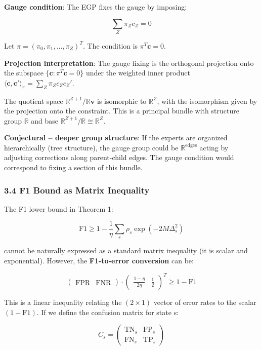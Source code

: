 \documentclass[
  12pt,
]{ctexart}
\begin{document}
\textbf{Gauge condition}: The EGP fixes the gauge by imposing:

\[\sum_{Z} \pi_Z c_Z = 0\]

Let \(\pi = (\pi_0, \pi_1, \dots, \pi_Z)^T\). The condition is
\(\pi^T \mathbf{c} = 0\).

\textbf{Projection interpretation}: The gauge fixing is the orthogonal
projection onto the subspace \(\{\mathbf{c}: \pi^T \mathbf{c} = 0\}\)
under the weighted inner product
\(\langle \mathbf{c}, \mathbf{c}' \rangle_\pi = \sum_Z \pi_Z c_Z c_Z'\).

The quotient space \(\mathbb{R}^{Z+1} / \mathbb{R}\mathbf{v}\) is
isomorphic to \(\mathbb{R}^Z\), with the isomorphism given by the
projection onto the constraint. This is a principal bundle with
structure group \(\mathbb{R}\) and base
\(\mathbb{R}^{Z+1}/\mathbb{R} \cong \mathbb{R}^Z\).

\textbf{Conjectural -- deeper group structure}: If the experts are
organized hierarchically (tree structure), the gauge group could be
\(\mathbb{R}^{\text{edges}}\) acting by adjusting corrections along
parent-child edges. The gauge condition would correspond to fixing a
section of this bundle.

\subsubsection{3.4 F1 Bound as Matrix
Inequality}\label{f1-bound-as-matrix-inequality}

The F1 lower bound in Theorem 1:

\[\text{F1} \geq 1 - \frac{1}{\eta}\sum_s \rho_s \exp(-2M\Delta_s^2)\]

cannot be naturally expressed as a standard matrix inequality (it is
scalar and exponential). However, the \textbf{F1-to-error conversion}
can be:

\[\begin{pmatrix} \text{FPR} & \text{FNR} \end{pmatrix} \cdot \begin{pmatrix} \frac{1-\eta}{2\eta} & \frac{1}{2} \end{pmatrix}^T \geq 1 - \text{F1}\]

This is a linear inequality relating the \((2 \times 1)\) vector of
error rates to the scalar \((1 - \text{F1})\). If we define the
confusion matrix for state s:

\[C_s = \begin{pmatrix} \text{TN}_s & \text{FP}_s \\ \text{FN}_s & \text{TP}_s \end{pmatrix}\]
\end{document}
